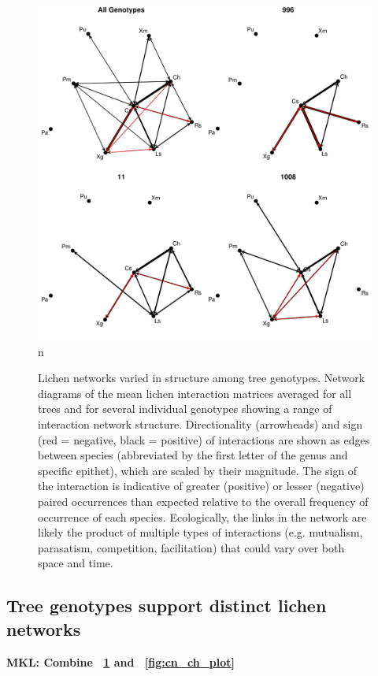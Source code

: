 \documentclass[9pt,twocolumn,twoside,lineno]{pnas-new}
\begin{document}
{\begin{figure}[ht]
\centering
\includegraphics[width=\linewidth]{cn_onc.pdf}n
\caption{Lichen networks varied in structure among tree
  genotypes. Network diagrams of the mean lichen interaction matrices
  averaged for all trees and for several individual genotypes showing
  a range of interaction network structure. Directionality
  (arrowheads) and sign (red = negative, black = positive) of
  interactions are shown as edges between species (abbreviated by the
  first letter of the genus and specific epithet), which are scaled by
  their magnitude. The sign of the interaction is indicative of
  greater (positive) or lesser (negative) paired occurrences than
  expected relative to the overall frequency of occurrence of each
  species. Ecologically, the links in the network are likely the
  product of multiple types of interactions (e.g. mutualism,
  parasatism, competition, facilitation) that could vary over both
  space and time.}
\label{fig:geno_nets}
\end{figure}

\subsection{Tree genotypes support distinct lichen networks}

\textbf{MKL: Combine ~\ref{fig:geno_nets} and ~\ref{fig:cn_ch_plot}}

}
\end{document}
